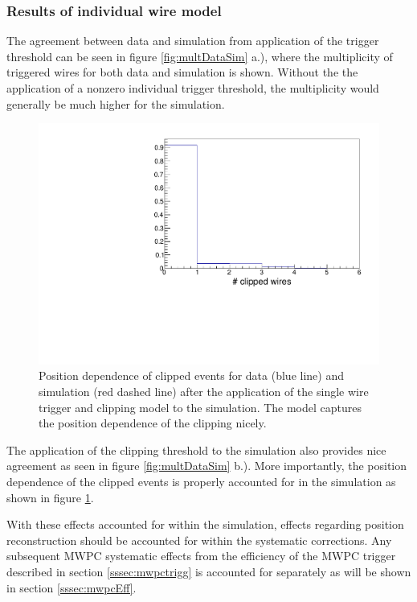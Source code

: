 \subsubsection{Results of individual wire model}

The agreement between data and simulation from application
of the trigger threshold can be seen in figure \ref{fig:multDataSim} a.), where
the multiplicity of triggered wires for both data and simulation is shown. Without the
the application of a nonzero individual trigger threshold, the multiplicity would
generally be much higher for the simulation.


\begin{figure}[h]
  \centering
  \includegraphics[scale=0.6,page=6]{4-UCNACalibrations/mwpc_position.pdf} 
  \caption{Position dependence of clipped events for data (blue line) and simulation (red dashed line) after
    the application of the single wire trigger and clipping model to the simulation. The model captures the
    position dependence of the clipping nicely.}
  \label{fig:clippedPos}
\end{figure}

The application of the clipping threshold to the simulation also provides nice agreement
as seen in figure \ref{fig:multDataSim} b.). More importantly, the position dependence
of the clipped events is properly accounted for in the simulation as shown in figure
\ref{fig:clippedPos}.

With these effects accounted for within the simulation, effects regarding position
reconstruction should be accounted for within the systematic corrections. Any subsequent
MWPC systematic effects from the efficiency of the MWPC trigger described in section
\ref{sssec:mwpctrigg} is accounted for separately as will be shown in section \ref{sssec:mwpcEff}.


